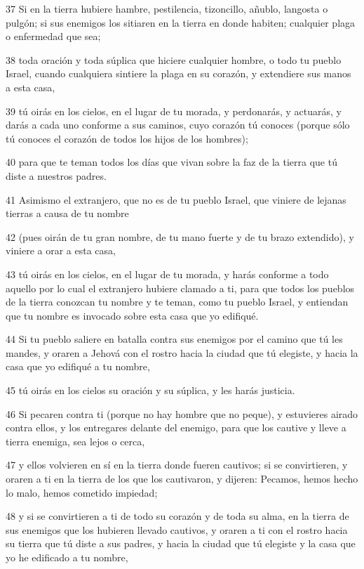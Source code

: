 \par 37 Si en la tierra hubiere hambre, pestilencia, tizoncillo, añublo, langosta o pulgón; si sus enemigos los sitiaren en la tierra en donde habiten; cualquier plaga o enfermedad que sea;
\par 38 toda oración y toda súplica que hiciere cualquier hombre, o todo tu pueblo Israel, cuando cualquiera sintiere la plaga en su corazón, y extendiere sus manos a esta casa,
\par 39 tú oirás en los cielos, en el lugar de tu morada, y perdonarás, y actuarás, y darás a cada uno conforme a sus caminos, cuyo corazón tú conoces (porque sólo tú conoces el corazón de todos los hijos de los hombres);
\par 40 para que te teman todos los días que vivan sobre la faz de la tierra que tú diste a nuestros padres.
\par 41 Asimismo el extranjero, que no es de tu pueblo Israel, que viniere de lejanas tierras a causa de tu nombre
\par 42 (pues oirán de tu gran nombre, de tu mano fuerte y de tu brazo extendido), y viniere a orar a esta casa,
\par 43 tú oirás en los cielos, en el lugar de tu morada, y harás conforme a todo aquello por lo cual el extranjero hubiere clamado a ti, para que todos los pueblos de la tierra conozcan tu nombre y te teman, como tu pueblo Israel, y entiendan que tu nombre es invocado sobre esta casa que yo edifiqué.
\par 44 Si tu pueblo saliere en batalla contra sus enemigos por el camino que tú les mandes, y oraren a Jehová con el rostro hacia la ciudad que tú elegiste, y hacia la casa que yo edifiqué a tu nombre,
\par 45 tú oirás en los cielos su oración y su súplica, y les harás justicia.
\par 46 Si pecaren contra ti (porque no hay hombre que no peque), y estuvieres airado contra ellos, y los entregares delante del enemigo, para que los cautive y lleve a tierra enemiga, sea lejos o cerca,
\par 47 y ellos volvieren en sí en la tierra donde fueren cautivos; si se convirtieren, y oraren a ti en la tierra de los que los cautivaron, y dijeren: Pecamos, hemos hecho lo malo, hemos cometido impiedad;
\par 48 y si se convirtieren a ti de todo su corazón y de toda su alma, en la tierra de sus enemigos que los hubieren llevado cautivos, y oraren a ti con el rostro hacia su tierra que tú diste a sus padres, y hacia la ciudad que tú elegiste y la casa que yo he edificado a tu nombre,
